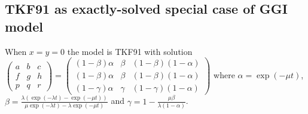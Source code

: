 \documentclass{article}
\begin{document}




\subsection{TKF91 as exactly-solved special case of GGI model}

When $x=y=0$ the model is TKF91 \cite{ThorneEtAl91}
with solution
$
\begin{pmatrix}
a & b & c \\
f & g & h \\
p & q & r 
\end{pmatrix}
=
\begin{pmatrix}
(1-\beta)\alpha & \beta & (1-\beta)(1-\alpha) \\
(1-\beta)\alpha & \beta & (1-\beta)(1-\alpha) \\
(1-\gamma)\alpha & \gamma & (1-\gamma)(1-\alpha)
\end{pmatrix}
$
where
$\alpha = \exp(-\mu t)$,
$\beta = \frac{\lambda \left( \exp(-\lambda t) - \exp(-\mu t) \right)}{\mu \exp(-\lambda t) - \lambda \exp(-\mu t)}$
and
$\gamma = 1 - \frac{\mu \beta}{\lambda (1 - \alpha)}$.
\end{document}
